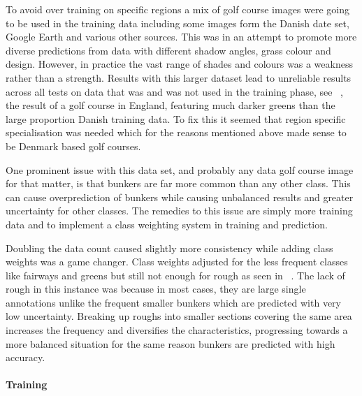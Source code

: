 \documentclass[final]{cmpreport_02}
\begin{document}
To avoid over training on specific regions a mix of golf course images were going to be used in the training data including some images form the Danish date set, Google Earth and various other sources.
This was in an attempt to promote more diverse predictions from data with different shadow angles, grass colour and design.
However, in practice the vast range of shades and colours was a weakness rather than a strength.
Results with this larger dataset lead to unreliable results across all tests on data that was and was not used in the training phase, see ~, the result of a golf course in England, featuring much darker greens than the large proportion Danish training data.
To fix this it seemed that region specific specialisation was needed which for the reasons mentioned above made sense to be Denmark based golf courses.

One prominent issue with this data set, and probably any data golf course image for that matter, is that bunkers are far more common than any other class.
This can cause overprediction of bunkers while causing unbalanced results and greater uncertainty for other classes.
The remedies to this issue are simply more training data and to implement a class weighting system in training and prediction.

Doubling the data count caused slightly more consistency while adding class weights was a game changer.
Class weights adjusted for the less frequent classes like fairways and greens but still not enough for rough as seen in ~.
The lack of rough in this instance was because in most cases, they are large single annotations unlike the frequent smaller bunkers which are predicted with very low uncertainty.
Breaking up roughs into smaller sections covering the same area increases the frequency and diversifies the characteristics, progressing towards a more balanced situation for the same reason bunkers are predicted with high accuracy.

\paragraph{Training} \
\end{document}
